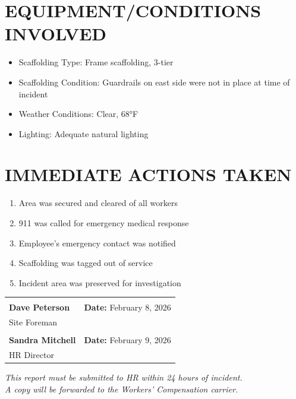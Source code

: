 \documentclass[11pt]{article}
\begin{document}
\section*{EQUIPMENT/CONDITIONS INVOLVED}

\begin{itemize}
\item Scaffolding Type: Frame scaffolding, 3-tier
\item Scaffolding Condition: Guardrails on east side were not in place at time of incident
\item Weather Conditions: Clear, 68°F
\item Lighting: Adequate natural lighting
\end{itemize}

\section*{IMMEDIATE ACTIONS TAKEN}

\begin{enumerate}
\item Area was secured and cleared of all workers
\item 911 was called for emergency medical response
\item Employee's emergency contact was notified
\item Scaffolding was tagged out of service
\item Incident area was preserved for investigation
\end{enumerate}

\vspace{2em}

\begin{tabular}{@{}p{7cm}p{7cm}@{}}
\hrulefill & \hrulefill \\
\textbf{Dave Peterson} & \textbf{Date:} February 8, 2026 \\
Site Foreman & \\[2em]
\hrulefill & \hrulefill \\
\textbf{Sandra Mitchell} & \textbf{Date:} February 9, 2026 \\
HR Director & \\
\end{tabular}

\vspace{1em}
\begin{center}
\small\textit{This report must be submitted to HR within 24 hours of incident.\\
A copy will be forwarded to the Workers' Compensation carrier.}
\end{center}
\end{document}
